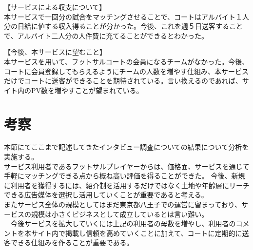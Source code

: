 【サービスによる収支について】
\\本サービスで一回分の試合をマッチングさせることで、コートはアルバイト１人分の日給に値する収入得ることが分かった。今後、これを週５日送客することで、アルバイト二人分の人件費に充てることができるとわかった。

【今後、本サービスに望むこと】
\\本サービスを用いて、フットサルコートの会員になるチームがなかった。今後、コートに会員登録してもらえるようにチームの人数を増やす仕組み、本サービスだけでコートに送客ができることを期待されている。言い換えるのであれば、サイト内のPV数を増やすことが望まれている。


\section{考察}
本節にてここまで記述してきたインタビュー調査についての結果について分析を実施する。
\\サービス利用者であるフットサルプレイヤーからは、価格面、サービスを通じて手軽にマッチングできる点から概ね高い評価を得ることができた。
今後、新規に利用者を獲得するには、紹介制を活用するだけではなく土地や年齢層にリーチできる広告媒体を選択し活用していくことが重要であると考える。
\\またサービス全体の規模としてはまだ東京都八王子での運営に留まっており、サービスの規模は小さくビジネスとして成立しているとは言い難い。
\\　今後サービスを拡大していくには上記の利用者の母数を増やし、利用者のコメントを本サイト内で掲載し信頼を高めていくことに加えて、コートに定期的に送客できる仕組みを作ることが重要である。



